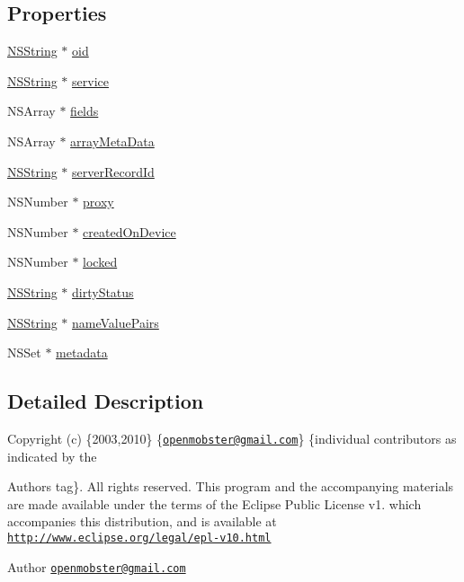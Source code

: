 \subsection*{\-Properties}
\begin{DoxyCompactItemize}
\item 
\hyperlink{class_n_s_string}{\-N\-S\-String} $\ast$ \hyperlink{interface_persistent_mobile_object_afa80219f03e1f03aac075e51137ad17f}{oid}
\item 
\hyperlink{class_n_s_string}{\-N\-S\-String} $\ast$ \hyperlink{interface_persistent_mobile_object_a51ce80ff0ce56b4db78017219f35786d}{service}
\item 
\-N\-S\-Array $\ast$ \hyperlink{interface_persistent_mobile_object_a84c99514fbe622c90ef5d38fdf498ef5}{fields}
\item 
\-N\-S\-Array $\ast$ \hyperlink{interface_persistent_mobile_object_a79247e2f78737421ccb41edb6ee91156}{array\-Meta\-Data}
\item 
\hyperlink{class_n_s_string}{\-N\-S\-String} $\ast$ \hyperlink{interface_persistent_mobile_object_aec81aad76e60d28de01d234960ec5344}{server\-Record\-Id}
\item 
\-N\-S\-Number $\ast$ \hyperlink{interface_persistent_mobile_object_a9ed51cfff2cf5faa1f68f844986fd182}{proxy}
\item 
\-N\-S\-Number $\ast$ \hyperlink{interface_persistent_mobile_object_a57725176a7a5b8700c9a521a5f674fa8}{created\-On\-Device}
\item 
\-N\-S\-Number $\ast$ \hyperlink{interface_persistent_mobile_object_a0c2d480a46fc2950670dd8f21bedcd13}{locked}
\item 
\hyperlink{class_n_s_string}{\-N\-S\-String} $\ast$ \hyperlink{interface_persistent_mobile_object_a6db24dda0c235dc2fd0a0cda855203e1}{dirty\-Status}
\item 
\hyperlink{class_n_s_string}{\-N\-S\-String} $\ast$ \hyperlink{interface_persistent_mobile_object_afdc8d7311db83999ec7c68a62eeda85f}{name\-Value\-Pairs}
\item 
\-N\-S\-Set $\ast$ \hyperlink{interface_persistent_mobile_object_a1c7639572e2cfa2125c161a055b5aab8}{metadata}
\end{DoxyCompactItemize}


\subsection{\-Detailed \-Description}
\-Copyright (c) \{2003,2010\} \{\href{mailto:openmobster@gmail.com}{\tt openmobster@gmail.\-com}\} \{individual contributors as indicated by the \begin{DoxyAuthor}{\-Authors}
tag\}. \-All rights reserved. \-This program and the accompanying materials are made available under the terms of the \-Eclipse \-Public \-License v1. which accompanies this distribution, and is available at \href{http://www.eclipse.org/legal/epl-v10.html}{\tt http\-://www.\-eclipse.\-org/legal/epl-\/v10.\-html}
\end{DoxyAuthor}
\begin{DoxyAuthor}{\-Author}
\href{mailto:openmobster@gmail.com}{\tt openmobster@gmail.\-com} 
\end{DoxyAuthor}


